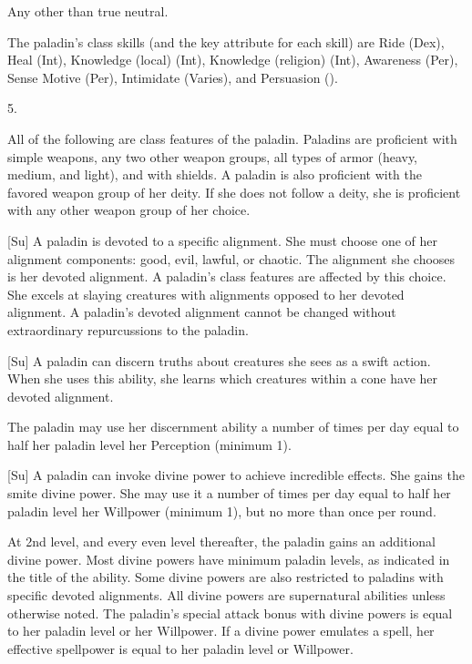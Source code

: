  Any other than true neutral.

The paladin's class skills (and the key attribute for each skill) are Ride (Dex), Heal (Int), Knowledge (local) (Int), Knowledge (religion) (Int), Awareness (Per), Sense Motive (Per), Intimidate (Varies), and Persuasion (\x).

5.

All of the following are class features of the paladin.
 Paladins are proficient with simple weapons,  any two other weapon groups,  all types of armor (heavy, medium, and light), and with shields.
A paladin is also proficient with the favored weapon group of her deity.
If she does not follow a deity, she is proficient with any other weapon group of her choice.

[Su]
A paladin is devoted to a specific alignment.
She must choose one of her alignment components: good, evil, lawful, or chaotic.
The alignment she chooses is her devoted alignment.
A paladin's class features are affected by this choice.
She excels at slaying creatures with alignments opposed to her devoted alignment.
A paladin's devoted alignment cannot be changed without extraordinary repurcussions to the paladin.

[Su]
A paladin can discern truths about creatures she sees as a swift action.
When she uses this ability, she learns which creatures within a \arealarge cone have her devoted alignment.

The paladin may use her discernment ability a number of times per day equal to half her paladin level \add her Perception (minimum 1).

[Su]
A paladin can invoke divine power to achieve incredible effects.
She gains the smite divine power.
She may use it a number of times per day equal to half her paladin level \add her Willpower (minimum 1), but no more than once per round.

At 2nd level, and every even level thereafter, the paladin gains an additional divine power.
Most divine powers have minimum paladin levels, as indicated in the title of the ability.
Some divine powers are also restricted to paladins with specific devoted alignments.
All divine powers are supernatural abilities unless otherwise noted.
The paladin's special attack bonus with divine powers is equal to her paladin level or her Willpower.
If a divine power emulates a spell, her effective spellpower is equal to her paladin level or Willpower.

